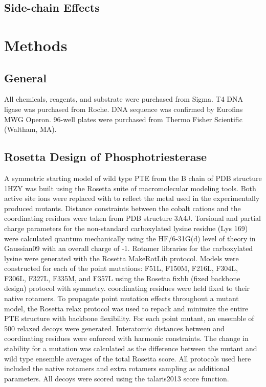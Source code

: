 \begin{refsection}
\subsection{Side-chain Effects}

\section{Methods}

\subsection{General}

All chemicals, reagents, and substrate were purchased from Sigma. T4 DNA ligase
was purchased from Roche. DNA sequence was confirmed by Eurofins MWG Operon.
96-well plates were purchased from Thermo Fisher Scientific (Waltham,
MA)\cite{Yang2014a}.

\subsection{Rosetta Design of Phosphotriesterase}

A symmetric starting model of wild type PTE from the B chain of PDB structure
1HZY\cite{Benning2001a} was built using the Rosetta suite of macromolecular
modeling tools\cite{Leaver-Fay2011}. Both active site  ions were
replaced with  to reflect the metal used in the experimentally
produced mutants.  Distance constraints between the cobalt cations and the
coordinating residues were taken from PDB structure 3A4J\cite{Jackson2009b}.
Torsional and partial charge parameters for the non-standard carboxylated
lysine residue (Lys 169) were calculated quantum mechanically using the
HF/6-31G(d) level of theory in Gaussian09\cite{Frisch2009} with an overall
charge of -1.  Rotamer libraries for the carboxylated lysine were generated
with the Rosetta MakeRotLib\cite{Renfrew2012b} protocol.  Models were
constructed for each of the point mutations: F51L, F150M, F216L, F304L, F306L,
F327L, F335M, and F357L using the Rosetta fixbb (fixed backbone design)
protocol with symmetry\cite{DiMaio2011a}.   coordinating residues
were held fixed to their native rotamers. To propagate point mutation effects
throughout a mutant model, the Rosetta relax protocol was used to repack and
minimize the entire PTE structure with backbone flexibility. For each point
mutant, an ensemble of 500 relaxed decoys were generated. Interatomic distances
between  and coordinating residues were enforced with harmonic
constraints.  The change in stability for a mutation was calculated as the
difference between the mutant and wild type ensemble averages of the total
Rosetta score. All protocols used here included the native rotamers and extra
rotamers sampling as additional parameters. All decoys were scored using the
talaris2013 score function\cite{Leaver-Fay2013a}.


\end{refsection}
